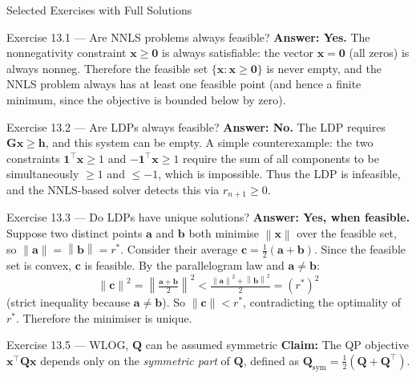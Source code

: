 \documentclass[aspectratio=169,10pt]{beamer}
\newcommand{\bx}{\mathbf{x}}
\newcommand{\bG}{\mathbf{G}}
\newcommand{\bh}{\mathbf{h}}
\newcommand{\bQ}{\mathbf{Q}}
\newcommand{\norm}[1]{\left\|#1\right\|}
\begin{document}
\begin{frame}[allowframebreaks]{Selected Exercises with Full Solutions}

  \begin{block}{Exercise 13.1 --- Are NNLS problems always feasible?}
    \textbf{Answer: Yes.}  The nonnegativity constraint $\bx \geq \mathbf{0}$ is
    always satisfiable: the vector $\bx = \mathbf{0}$ (all zeros) is always
    nonneg.  Therefore the feasible set $\{\bx : \bx \geq \mathbf{0}\}$ is
    never empty, and the NNLS problem always has at least one feasible point
    (and hence a finite minimum, since the objective is bounded below by zero).
  \end{block}

  \begin{block}{Exercise 13.2 --- Are LDPs always feasible?}
    \textbf{Answer: No.}  The LDP requires $\bG\bx \geq \bh$, and this system
    can be empty.  A simple counterexample: the two constraints
    $\mathbf{1}^{\top}\bx \geq 1$ and $-\mathbf{1}^{\top}\bx \geq 1$
    require the sum of all components to be simultaneously $\geq 1$ and $\leq -1$,
    which is impossible.  Thus the LDP is infeasible, and the NNLS-based solver
    detects this via $r_{n+1} \geq 0$.
  \end{block}

  \begin{block}{Exercise 13.3 --- Do LDPs have unique solutions?}
    \textbf{Answer: Yes, when feasible.}  Suppose two distinct points
    $\mathbf{a}$ and $\mathbf{b}$ both minimise $\norm{\bx}$ over the
    feasible set, so $\norm{\mathbf{a}} = \norm{\mathbf{b}} = r^*$.
    Consider their average $\mathbf{c} = \tfrac{1}{2}(\mathbf{a}+\mathbf{b})$.
    Since the feasible set is convex, $\mathbf{c}$ is feasible.
    By the parallelogram law and $\mathbf{a} \neq \mathbf{b}$:
    \[
      \norm{\mathbf{c}}^2
      = \left\|\tfrac{\mathbf{a}+\mathbf{b}}{2}\right\|^2
      < \tfrac{\norm{\mathbf{a}}^2 + \norm{\mathbf{b}}^2}{2}
      = (r^*)^2
    \]
    (strict inequality because $\mathbf{a} \neq \mathbf{b}$).
    So $\|\mathbf{c}\| < r^*$, contradicting the optimality of $r^*$.
    Therefore the minimiser is unique.
  \end{block}

  \framebreak

  \begin{block}{Exercise 13.5 --- WLOG, $\bQ$ can be assumed symmetric}
    \textbf{Claim:} The QP objective $\bx^{\top}\bQ\bx$ depends only on the
    \emph{symmetric part} of $\bQ$, defined as
    $\bQ_{\mathrm{sym}} = \tfrac{1}{2}(\bQ + \bQ^{\top})$.


\end{block}
\end{frame}
\end{document}
